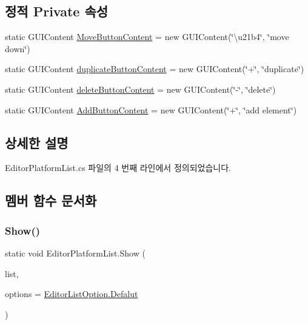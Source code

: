 \subsection*{정적 Private 속성}
\begin{DoxyCompactItemize}
\item 
static G\+U\+I\+Content \mbox{\hyperlink{class_editor_platform_list_a49d984355385da84a591d38aae7514db}{Move\+Button\+Content}} = new G\+U\+I\+Content(\char`\"{}\textbackslash{}u21b4\char`\"{}, \char`\"{}move down\char`\"{})
\item 
static G\+U\+I\+Content \mbox{\hyperlink{class_editor_platform_list_a6e8a9ff76288daab5d7e50864508c8ba}{duplicate\+Button\+Content}} = new G\+U\+I\+Content(\char`\"{}+\char`\"{}, \char`\"{}duplicate\char`\"{})
\item 
static G\+U\+I\+Content \mbox{\hyperlink{class_editor_platform_list_ab1bcf67efe880dd93508b5fbd2b3f9b2}{delete\+Button\+Content}} = new G\+U\+I\+Content(\char`\"{}-\/\char`\"{}, \char`\"{}delete\char`\"{})
\item 
static G\+U\+I\+Content \mbox{\hyperlink{class_editor_platform_list_a559a7c5291210aaca311116efb71b06f}{Add\+Button\+Content}} = new G\+U\+I\+Content(\char`\"{}+\char`\"{}, \char`\"{}add element\char`\"{})
\end{DoxyCompactItemize}


\subsection{상세한 설명}


Editor\+Platform\+List.\+cs 파일의 4 번째 라인에서 정의되었습니다.



\subsection{멤버 함수 문서화}
\mbox{\label{class_editor_platform_list_afa78a25fbabdf962ead1dfefbddf50fd}} 
\subsubsection{\texorpdfstring{Show()}{Show()}}
{\footnotesize\ttfamily static void Editor\+Platform\+List.\+Show (\begin{DoxyParamCaption}\item[{Serialized\+Property}]{list,  }\item[{\mbox{\hyperlink{_editor_list_option_8cs_a5da45ed8a8d189e2c165cf7e1c6ceb29}{Editor\+List\+Option}}}]{options = {\ttfamily \mbox{\hyperlink{_editor_list_option_8cs_a5da45ed8a8d189e2c165cf7e1c6ceb29a3f65886bc4b4c4e553684df4fb5fdba9}{Editor\+List\+Option.\+Defalut}}} }\end{DoxyParamCaption})\hspace{0.3cm}{\ttfamily [static]}}



